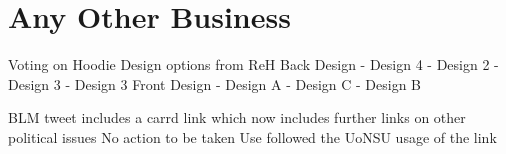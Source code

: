 \documentclass[11pt]{meetingmins}
\begin{document}
\section{Any Other Business}
\begin{items}
  \item
  Voting on Hoodie Design options from ReH
    \subitem
    Back Design
       - Design 4
       - Design 2
       - Design 3
       - Design 3
    \subitem
    Front Design
       - Design A
       - Design C
       - Design B
  \item
  BLM tweet includes a carrd link which now includes further links on other political issues
    \subitem
    No action to be taken
    \subitem
    Use followed the UoNSU usage of the link
\end{items}

\vspace{1em}
\nextmeeting{}
\end{document}
